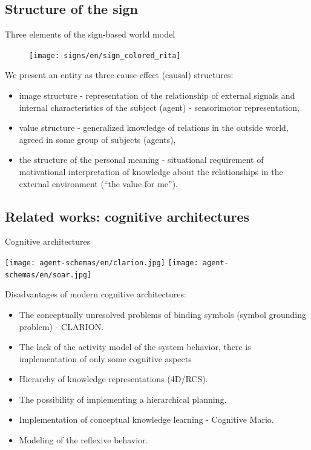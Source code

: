 \documentclass[default]{beamer}
\begin{document}
	\subsection{Structure of the sign}
	\begin{frame}{Three elements of the sign-based world model}
		\footnotesize
		\begin{figure}
			\texttt{[image: signs/en/sign\_colored\_rita]}
		\end{figure}
		
		We present an entity as three cause-effect (causal) structures:
		\begin{itemize}
			\item {\color{red}image structure} - representation of the relationship of external signals and internal characteristics of the subject (agent) - sensorimotor representation,
			\item {\color{blue}value structure} - generalized knowledge of relations in the outside world, agreed in some group of subjects (agents),
			\item {\color{green!60!black}the structure of the personal meaning} - situational requirement of motivational interpretation of knowledge about the relationships in the external environment (``the value for me'').
		\end{itemize}
	
		\nocite{*}
		\printbibliography[keyword={qualia}, resetnumbers=true]
	\end{frame}
	
	\subsection{Related works: cognitive architectures}
	\begin{frame}{Cognitive architectures}
		\begin{center}
			\texttt{[image: agent-schemas/en/clarion.jpg]}
			\texttt{[image: agent-schemas/en/soar.jpg]}
		\end{center}
		\scriptsize
		Disadvantages of modern cognitive architectures:
		\begin{itemize}
			\item The conceptually unresolved problems of binding symbols (symbol grounding problem) - CLARION.
			\item The lack of the activity model of the system behavior, there is implementation of only some cognitive aspects
			\item Hierarchy of knowledge representations (4D/RCS).
			\item The possibility of implementing a hierarchical planning.
			\item Implementation of conceptual knowledge learning - Cognitive Mario.
			\item Modeling of the reflexive behavior.
		\end{itemize}
		\vspace{-5pt}
		\nocite{*}
		\printbibliography[keyword={symbgrnd}, resetnumbers=true]
	\end{frame}
	
\end{document}
